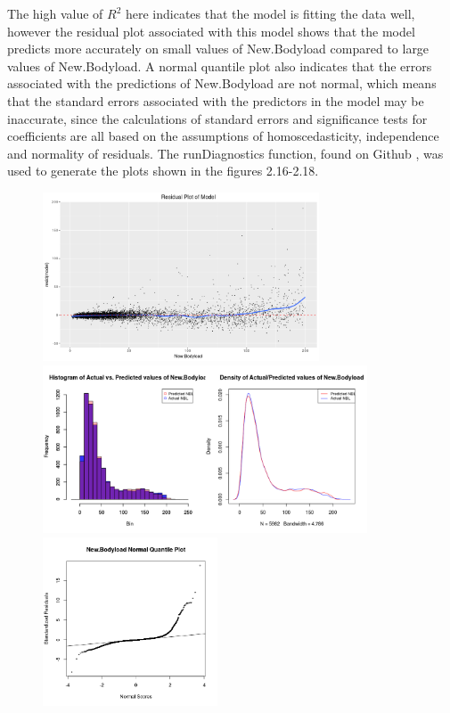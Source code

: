 The high value of $R^2$ here indicates that the model is fitting the data well, however the residual plot associated with this model shows that the model predicts more accurately on small values of New.Bodyload compared to large values of New.Bodyload. A normal quantile plot also indicates that the errors associated with the predictions of New.Bodyload are not normal, which means that the standard errors associated with the predictors in the model may be inaccurate, since the calculations of standard errors and significance tests for coefficients are all based on the assumptions of homoscedasticity, independence and normality of residuals. The runDiagnostics function, found on Github \cite{ModellingWithoutOutliers}, was used to generate the plots shown in the figures 2.16-2.18.
\hfill\break
\begin{figure}[h]
	\centering
	\begin{minipage}{.33\textwidth}
		\centering
		\includegraphics[width=.9\linewidth, height=5cm]{Images/SimpleLinearResidual.png}
	\end{minipage}%
	\centering
	\begin{minipage}{.33\textwidth}
		\centering
		\includegraphics[width=.9\linewidth, height=5cm]{Images/SimpleLinearHist.png}
	\end{minipage}%
	\begin{minipage}{.33\textwidth}
		\centering
		\includegraphics[width=.9\linewidth, height=5cm]{Images/QuantilePlot.png}
	\end{minipage}
\end{figure}

